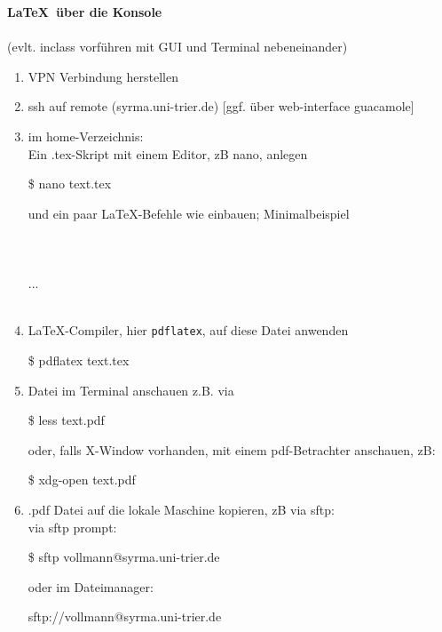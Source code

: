  \textbf{\LaTeX~über die Konsole}\\
	~\\
	(evlt. inclass vorführen mit GUI und Terminal nebeneinander)
	\begin{enumerate}
		\item VPN Verbindung herstellen
		\item ssh auf remote (syrma.uni-trier.de) [ggf. über web-interface guacamole]
		\item im home-Verzeichnis:\\
		Ein .tex-Skript mit einem Editor, zB nano, anlegen\

			\$ nano text.tex

		und ein paar \LaTeX-Befehle wie  einbauen; Minimalbeispiel\\[0.1cm]
		\hspace*{0.5cm}\\
		\hspace*{0.5cm}\\
		\hspace*{0.5cm}\\
		\hspace*{0.5cm}\hspace*{0.5cm}...\\
		\hspace*{0.5cm}\\
		\item \LaTeX-Compiler, hier \texttt{pdflatex}, auf diese Datei anwenden

			\$ pdflatex text.tex

		\item Datei im Terminal anschauen z.B. via

			\$ less text.pdf

		oder, falls X-Window vorhanden, mit einem pdf-Betrachter anschauen, zB:

			\$ xdg-open text.pdf

		\item .pdf Datei auf die lokale Maschine kopieren, zB via sftp:\\
		via sftp prompt:

			\$ sftp vollmann@syrma.uni-trier.de

		oder im Dateimanager:

			sftp://vollmann@syrma.uni-trier.de

	\end{enumerate}




